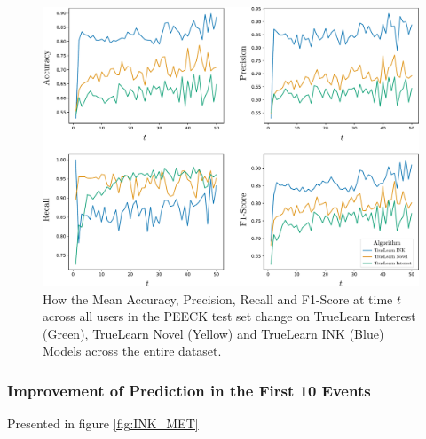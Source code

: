 \documentclass[letterpaper]{article} %
\begin{document}
\begin{figure}[h]
\begin{center}
    \centerline{\includegraphics[width=\linewidth]{INK_accuracy.pdf}}
    \caption{How the Mean Accuracy, Precision, Recall and F1-Score at time $t$ across all users in the PEECK test set change on TrueLearn Interest (Green), TrueLearn Novel (Yellow) and TrueLearn INK (Blue) Models across the entire dataset.}
     \label{fig:INK_ACC}
\end{center}
\end{figure}

\subsubsection{Improvement of Prediction in the First 10 Events}

Presented in figure \ref{fig:INK_MET}
\end{document}
